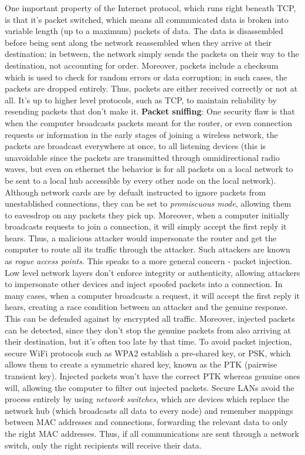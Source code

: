 \documentclass{article}
\begin{document}
One important property of the Internet protocol, which runs right beneath TCP, is that it's packet switched, which means all communicated data is broken into variable length (up to a maximum) packets of data. The data is disassembled before being sent along the network reassembled when they arrive at their destination; in between, the network simply sends the packets on their way to the destination, not accounting for order. Moreover, packets include a checksum which is used to check for random errors or data corruption; in such cases, the packets are dropped entirely. Thus, packets are either received correctly or not at all. It's up to higher level protocols, such as TCP, to maintain reliability by resending packets that don't make it.
\newline \newline
\textbf{Packet sniffing}: One security flaw is that when the computer broadcasts packets meant for the router, or even connection requests or information in the early stages of joining a wireless network, the packets are broadcast everywhere at once, to all listening devices (this is unavoidable since the packets are transmitted through omnidirectional radio waves, but even on ethernet the behavior is for all packets on a local network to be sent to a local hub accessible by every other node on the local network). Although network cards are by defualt instructed to ignore packets from unestablished connections, they can be set to \textit{promiscuous mode}, allowing them to eavesdrop on any packets they pick up.
\newline \newline
Moreover, when a computer initially broadcasts requests to join a connection, it will simply accept the first reply it hears. Thus, a malicious attacker would impersonate the router and get the computer to route all its traffic through the attacker. Such attackers are known as \textit{rogue access points}. This speaks to a more general concern - packet injection. Low level network layers don't enforce integrity or authenticity, allowing attackers to impersonate other devices and inject spoofed packets into a connection. In many cases, when a computer broadcasts a request, it will accept the first reply it hears, creating a race condition between an attacker and the genuine response. This can be defended against by encrypted all traffic. Moreover, injected packets can be detected, since they don't stop the genuine packets from also arriving at their destination, but it's often too late by that time.
\newline
To avoid packet injection, secure WiFi protocols such as WPA2 establish a pre-shared key, or PSK, which allows them to create a symmetric shared key, known as the PTK (pairwise transient key). Injected packets won't have the correct PTK whereas genuine ones will, allowing the computer to filter out injected packets. Secure LANs avoid the process entirely by using \textit{network switches}, which are devices which replace the network hub (which broadcasts all data to every node) and remember mappings between MAC addresses and connections, forwarding the relevant data to only the right MAC addresses. Thus, if all communications are sent through a network switch, only the right recipients will receive their data.
\end{document}
